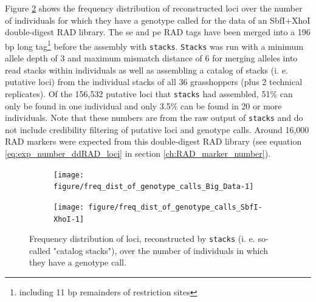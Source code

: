 \documentclass[a4paper,12pt,times,print,index,custombib,custommargin]{PhDThesisPSnPDF}\usepackage[]{graphicx}\usepackage[]{color}
\newenvironment{knitrout}{}{} %
\begin{document}
Figure \ref{ddRAD:freq_dist_of_genotype_calls} shows the frequency distribution of reconstructed loci over the number of individuals for which they have a genotype called for the data of an \gls{SbfI}$+$\gls{XhoI} double-digest RAD library. The \gls{se} and \gls{pe} \glspl{RAD tag} have been merged into a 196 \gls{bp} long tag\footnote{including 11 bp remainders of restriction sites} before the assembly with \texttt{stacks}. \texttt{Stacks} was run with a minimum allele depth of 3 and maximum mismatch distance of 6 for merging alleles into read stacks within individuals as well as assembling a catalog of stacks (i. e. putative loci) from the individual stacks of all 36 grasshoppers (plus 2 technical replicates). Of the 156,532 putative loci that \texttt{stacks} had assembled, 51\% can only be found in one individual and only 3.5\% can be found in 20 or more individuals. Note that these numbers are from the raw output of \texttt{stacks} and do not include credibility filtering of putative loci and genotype calls. Around 16,000 RAD markers were expected from this double-digest RAD library (see equation \ref{eq:exp_number_ddRAD_loci} in section \ref{ch:RAD_marker_number}).
%
%
\begin{figure}
\centering
\begin{subfigure}[t]{.495\textwidth}
\begin{knitrout}
\color{fgcolor}

{\centering \texttt{[image: figure/freq\_dist\_of\_genotype\_calls\_Big\_Data-1]} 

}



\end{knitrout}
\caption{}
\label{Big_Data:freq_dist_of_genotype_calls}
\end{subfigure}
\hfill
\begin{subfigure}[t]{.495\textwidth}
\begin{knitrout}
\color{fgcolor}

{\centering \texttt{[image: figure/freq\_dist\_of\_genotype\_calls\_SbfI-XhoI-1]} 

}



\end{knitrout}
\caption{}
\label{ddRAD:freq_dist_of_genotype_calls}
\end{subfigure}
\caption{Frequency distribution of loci, reconstructed by \texttt{stacks} (i. e. so-called "catalog stacks"), over the number of individuals in which they have a genotype call.}
\label{freq_dist_of_genotype_calls}
\end{figure}
\end{document}

